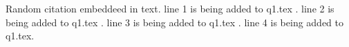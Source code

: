 \documentclass{article}
\begin{document}
Random citation \cite{DUMMY:1} embeddeed in text.
line 1 is being added to q1.tex .\linebreak
line 2 is being added to q1.tex .\linebreak
line 3 is being added to q1.tex .\linebreak
line 4 is being added to q1.tex.

\newpage

 

\end{document}
